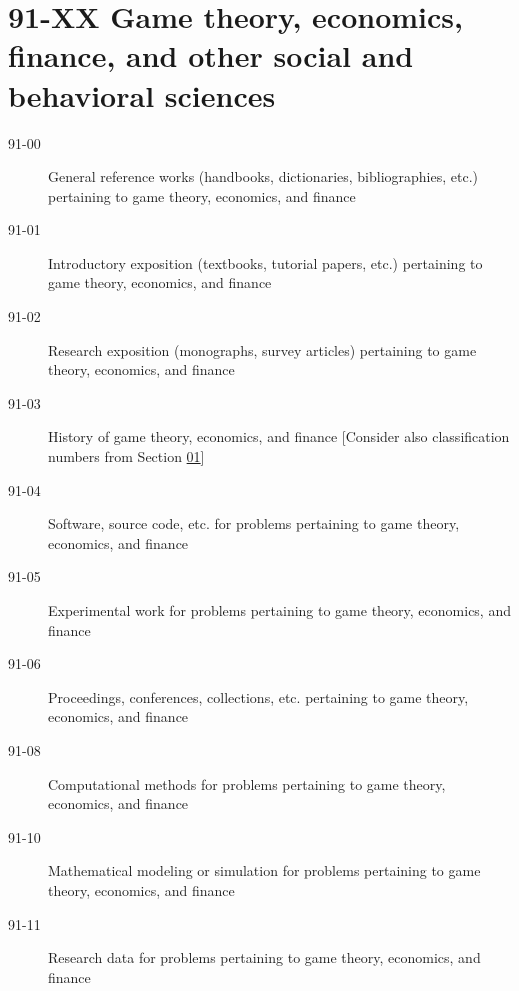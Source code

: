 \section*{91-XX Game theory, economics, finance, and other social and behavioral sciences }\label{91-XX}
\begin{description}
\item [91-00]\label{91-00} General reference works (handbooks, dictionaries, bibliographies, etc.) pertaining to game theory, economics, and finance
\item [91-01]\label{91-01} Introductory exposition (textbooks, tutorial papers, etc.) pertaining to game theory, economics, and finance
\item [91-02]\label{91-02} Research exposition (monographs, survey articles) pertaining to game theory, economics, and finance
\item [91-03]\label{91-03} History of game theory, economics, and finance [Consider also classification numbers from Section \hyperref[01-XX]{01}]
\item [91-04]\label{91-04} Software, source code, etc. for problems pertaining to game theory, economics, and finance
\item [91-05]\label{91-05} Experimental work for problems pertaining to game theory, economics, and finance
\item [91-06]\label{91-06} Proceedings, conferences, collections, etc. pertaining to game theory, economics, and finance
\item [91-08]\label{91-08} Computational methods for problems pertaining to game theory, economics, and finance
\item [91-10]\label{91-10} Mathematical modeling or simulation for problems pertaining to game theory, economics, and finance
\item [91-11]\label{91-11} Research data for problems pertaining to game theory, economics, and finance
\end{description}

